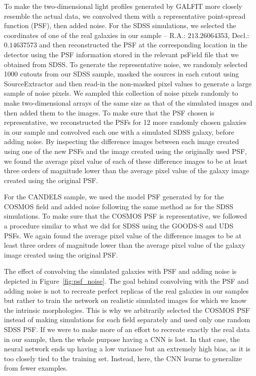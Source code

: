 To make the two-dimensional light profiles generated by GALFIT more closely resemble the actual data, we convolved them with a representative point-spread function (PSF), then added noise. For the SDSS simulations, we selected the coordinates of one of the real galaxies in our sample -- R.A.: $213.26064353$, Decl.: $0.14637573$ and then reconstructed the PSF at the corresponding location in the detector using the PSF information stored in the relevant psField file that we obtained from SDSS. To generate the representative noise, we randomly selected 1000 cutouts from our SDSS sample, masked the sources in each cutout using SourceExtractor \citep{s_extract} and then read-in the non-masked pixel values to generate a large sample of noise pixels. We sampled this collection of noise pixels randomly to make two-dimensional arrays of the same size as that of the simulated images and then added them to the images. To make sure that the PSF chosen is representative, we reconstructed the PSFs for 12 more randomly chosen galaxies in our sample and convolved each one with a simulated SDSS galaxy, before adding noise. By inspecting the difference images between each image created using one of the new PSFs and the image created using the originally used PSF, we found the average pixel value of each of these difference images to be at least three orders of magnitude lower than the average pixel value of the galaxy image created using the original PSF.


For the CANDELS sample, we used the model PSF generated by \citet{vdw_12} for the COSMOS field and added noise following the same method as for the SDSS simulations. To make sure that the COSMOS PSF is representative, we followed a procedure similar to what we did for SDSS using the GOODS-S and UDS PSFs. We again found the average pixel value of the difference images to be at least three orders of magnitude lower than the average pixel value of the galaxy image created using the original PSF. 

The effect of convolving the simulated galaxies with PSF and adding noise is depicted in Figure~\ref{fig:psf_noise}. The goal behind convolving with the PSF and adding noise is not to recreate perfect replicas of the real galaxies in our samples but rather to train the network on realistic simulated images for which we know the intrinsic morphologies. This is why we arbitrarily selected the COSMOS PSF instead of making simulations for each field separately and used only one random SDSS PSF. If we were to make more of an effort to recreate exactly the real data in our sample, then the whole purpose having a CNN is lost. In that case, the neural network ends up having a low variance but an extremely high bias, as it is too closely tied to the training set. Instead, here, the CNN learns to generalize from fewer examples.  

